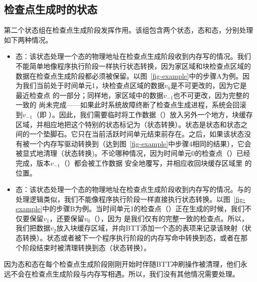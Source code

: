 \subsection{检查点生成时的状态}
\label{subsec:states-ckpt}

第二个状态组在检查点生成阶段发挥作用。该组包含两个状态，态和态，分别处理如下两种情况。

\begin{itemize}
\item
\textbf{}态：该状态处理一个态的物理地址在检查点生成阶段收到内存写的情况。我们不能简单地像程序执行阶段一样执行状态转换，因为家区域和块检查点区域的数据在检查点生成阶段都必须被保留。以图~\ref{fig-example}中的步骤A为例。因为我们当前处于时间单元1，块检查点区域的数据$v_0$是不可更改的，因为它是最近检查点 \cl 的一部分；同样地，家区域中的数据$v_{-1}$也不可更改，因为完整的一致的 \cl 尚未完成——如果此时系统故障终断了检查点生成进程，系统会回滚到$v_{-1}$（即 \cp）。因此，我们需要临时将工作数据（\wa）放入另外一个地方，块缓存区域，并相应地把这个特别的状态标记为（状态转换）。状态是状态和状态之间的一个垫脚石。它只在当前活跃时间单元结束前存在。之后，如果该状态没有被一个内存写驱动转换到（达到图~\ref{fig-example}中步骤4相同的结果），它会被显式地清理（状态转换)。不论哪种情况，因为时间单元0的检查点（\cl）已经完成，版本$v_{-1}$（\cp）都会被工作数据 \wa 安全地覆写，并相应收回块缓存区域里 \wa 的位置。
\item
\textbf{}态：该状态处理一个态的物理地址在检查点生成阶段收到内存写的情况。与的处理逻辑类似，我们不能像程序执行阶段一样直接执行状态转换。以图~\ref{fig-example}中的步骤B为例。当时间单元1的检查点（\cl）正在生成的时候，我们不仅要保留$v_1$，还要保留$v_0$（\cp），因为 \cp 是我们仅有的完整一致的检查点。所以，我们把数据$v_2$放入块缓存区域，并向BTT添加一个态的表项来记录该映射（状态转换）。状态或者被下一个程序执行阶段的内存写命中转换到态，或者在那个阶段结束时被清理转换到态（状态转换）。
\end{itemize}

因为态和态在每个检查点生成阶段刚刚开始时伴随BTT冲刷操作被清理，他们永远不会在检查点生成阶段与内存写相遇。所以，我们没有其他情况需要处理。

